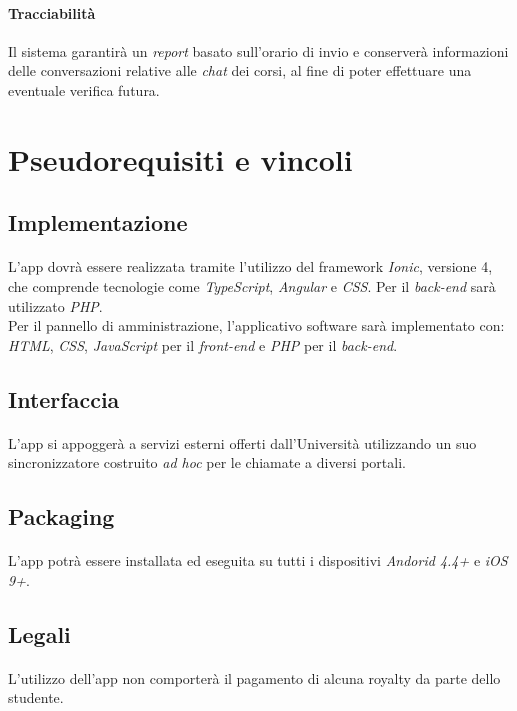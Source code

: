 \paragraph{Tracciabilità\\} 
Il sistema garantirà un \emph{report} basato sull’orario di invio e conserverà informazioni delle conversazioni relative alle \emph{chat} dei corsi, al fine di poter effettuare una eventuale verifica futura.\\

\section{Pseudorequisiti e vincoli}
\subsection{Implementazione}
\paragraph{}
L’app dovrà essere realizzata tramite l’utilizzo del framework \textit{Ionic}, versione 4, che comprende tecnologie come \emph{TypeScript}, \emph{Angular} e \emph{CSS}.
Per il \emph{back-end} sarà utilizzato \emph{PHP}.\\
Per il pannello di amministrazione, l'applicativo software sarà implementato con:\\
\emph{HTML}, \emph{CSS}, \emph{JavaScript} per il \emph{front-end} e \emph{PHP} per il \emph{back-end}.


\subsection{Interfaccia}
\paragraph{}
L’app si appoggerà a servizi esterni offerti dall’Università utilizzando un suo sincronizzatore costruito \textit{ad hoc} per le chiamate a diversi portali.

\subsection{Packaging}
\paragraph{}
L’app potrà essere installata ed eseguita su tutti i dispositivi \textit{Andorid 4.4+} e \textit{iOS 9+}.

\subsection{Legali}
\paragraph{}
L’utilizzo dell’app non comporterà il pagamento di alcuna royalty da parte dello studente.


\clearpage
